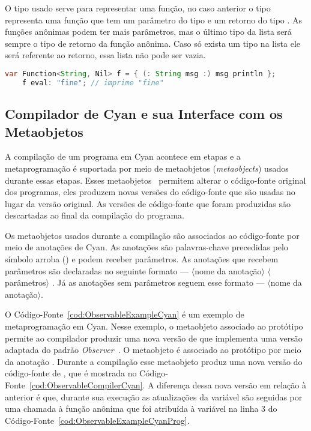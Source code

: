 O tipo  usado serve para representar uma função, no caso anterior o tipo  representa uma função que tem um parâmetro do tipo  e um retorno do tipo . As funções anônimas podem ter mais parâmetros, mas o último tipo da lista será sempre o tipo de retorno da função anônima. Caso só exista um tipo na lista ele será referente ao retorno, essa lista não pode ser vazia.  

\begin{lstlisting}[language=Java, caption={Definição e Uso de uma Função Anônima}, label={cod:FuncAnonima}]
	var Function<String, Nil> f = { (: String msg :) msg println };
	f eval: "fine"; // imprime "fine"
\end{lstlisting}

\subsection{Compilador de Cyan e sua Interface com os Metaobjetos}
\label{sec:cyanmtobstep}

A compilação de um programa em Cyan acontece em etapas e a metaprogramação é suportada por meio de metaobjetos (\emph{metaobjects}) usados durante essas etapas. Esses metaobjetos~\cite{josemetalangcyan} permitem alterar o código-fonte original dos programas, eles produzem novas versões do código-fonte que são usadas no lugar da versão original. As versões de código-fonte que foram produzidas são descartadas ao final da compilação do programa.

Os metaobjetos usados durante a compilação são associados ao código-fonte por meio de anotações de Cyan. As anotações são palavras-chave precedidas pelo símbolo arroba () e podem receber parâmetros. As anotações que recebem parâmetros são declaradas no seguinte formato --- $\langle$nome da anotação$\rangle$\srcstyle{(} $\langle$parâmetros$\rangle$ \srcstyle{)}. Já as anotações sem parâmetros seguem esse formato --- $\langle$nome da anotação$\rangle$.

O Código-Fonte~\ref{cod:ObservableExampleCyan} é um exemplo de metaprogramação em Cyan. Nesse exemplo, o metaobjeto associado ao protótipo permite ao compilador produzir uma nova versão de  que implementa uma versão adaptada do padrão \emph{Observer}~\cite{Gamma:1995:DPE:186897}. O metaobjeto é associado ao protótipo por meio da anotação . Durante a compilação esse metaobjeto produz uma nova versão do código-fonte de , que é mostrada no Código-Fonte~\ref{cod:ObservableCompilerCyan}. A diferença dessa nova versão em relação à anterior é que, durante sua execução as atualizações da variável  são seguidas por uma chamada à função anônima que foi atribuída à variável  na linha 3 do Código-Fonte~\ref{cod:ObservableExampleCyanProg}.

